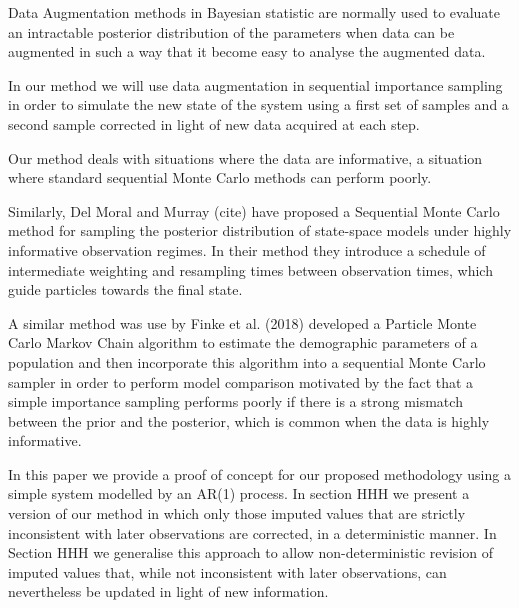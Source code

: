 \documentclass[11pt,a4paper]{article}
\begin{document}
Data Augmentation methods in Bayesian statistic are normally used to evaluate an intractable posterior distribution of the parameters when data can be augmented in such a way that it become easy to analyse the augmented data. \cite{Tanner}

In our method we will use data augmentation in sequential importance sampling in order to simulate the new state of the system using a first set of samples and a second sample corrected in light of new data acquired at each step.

Our method deals with situations where the data are informative, a situation where standard sequential Monte Carlo methods can perform poorly. 

Similarly, Del Moral and Murray (cite) have proposed a Sequential Monte Carlo method for sampling the posterior distribution of state-space models under highly informative observation regimes. In their method they introduce a schedule of intermediate weighting and resampling times between observation times, which guide particles towards the final state.

A similar method was use by Finke et al. (2018) developed a Particle Monte Carlo Markov Chain algorithm to estimate the demographic parameters of a population and then incorporate this algorithm into a sequential Monte Carlo sampler in order to perform model comparison motivated by the fact that a simple importance sampling performs poorly if there is a strong mismatch between the prior and the posterior, which is common when the data is highly informative.


In this paper we provide a proof of concept for our proposed methodology using a simple system modelled by an AR(1) process. In section HHH we present a version of our method in which only those imputed values that are strictly inconsistent with later observations are corrected, in a deterministic manner. In Section HHH we generalise this approach to allow non-deterministic revision of imputed values that, while not inconsistent with later observations, can nevertheless be updated in light of new information.
\end{document}
